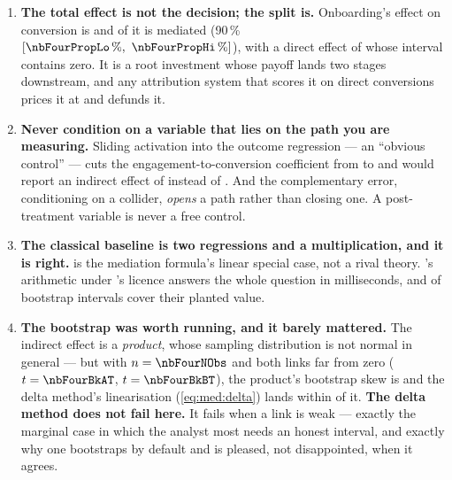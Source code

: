 \begin{enumerate}[leftmargin=*, itemsep=.45em]
  \item \textbf{The total effect is not the decision; the split is.} Onboarding's effect on
        conversion is \nbFourBayesTotal{} and \pc{\nbFourPropMediated} of it is mediated
        (90\,\% $[\pc{\nbFourPropLo},\ \pc{\nbFourPropHi}]$), with a direct effect of
        \nbFourBayesDirect{} whose interval contains zero. It is a root investment whose payoff lands
        two stages downstream, and any attribution system that scores it on direct conversions prices
        it at \nbFourNaiveOnCoef{} and defunds it.

  \item \textbf{Never condition on a variable that lies on the path you are measuring.} Sliding
        activation into the outcome regression --- an ``obvious control'' --- cuts the
        engagement-to-conversion coefficient from \nbFourBlockingBOk{} to \nbFourBlockingBBad{} and
        would report an indirect effect of \nbFourBlockingNie{} instead of \nbFourBkNie. And the
        complementary error, conditioning on a collider, \emph{opens} a path rather than closing one.
        A post-treatment variable is never a free control.

  \item \textbf{The classical baseline is two regressions and a multiplication, and it is right.}
         is the mediation formula's linear special case, not a rival theory.
        's arithmetic under \citeauthor{imai2010}'s licence answers the whole
        question in milliseconds, and \nbFourClNCover{} of \nbFourNEstimands{} bootstrap intervals
        cover their planted value.

  \item \textbf{The bootstrap was worth running, and it barely mattered.} The indirect effect is a
        \emph{product}, whose sampling distribution is not normal in general --- but with
        $n = \nbFourNObs$ and both links far from zero ($t = \nbFourBkAT$, $t = \nbFourBkBT$), the
        product's bootstrap skew is \nbFourNieBootSkew{} and the delta method's linearisation
        (\cref{eq:med:delta}) lands within \pc{\nbFourSeGapPct} of it. \textbf{The delta method does
        not fail here.} It fails when a link is weak --- exactly the marginal case in which the
        analyst most needs an honest interval, and exactly why one bootstraps by default and is
        pleased, not disappointed, when it agrees.


\end{enumerate}
